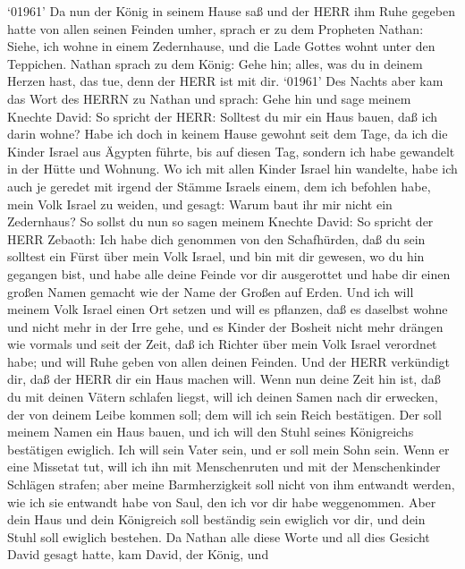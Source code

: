  `01961' Da nun der König in seinem Hause saß und der HERR
ihm Ruhe gegeben hatte von allen seinen Feinden umher, 
sprach er zu dem Propheten Nathan: Siehe, ich wohne in einem
Zedernhause, und die Lade Gottes wohnt unter den Teppichen. 
Nathan sprach zu dem König: Gehe hin; alles, was du in deinem Herzen
hast, das tue, denn der HERR ist mit dir.  `01961' Des
Nachts aber kam das Wort des HERRN zu Nathan und sprach: 
Gehe hin und sage meinem Knechte David: So spricht der HERR: Solltest du
mir ein Haus bauen, daß ich darin wohne?  Habe ich doch in
keinem Hause gewohnt seit dem Tage, da ich die Kinder Israel aus Ägypten
führte, bis auf diesen Tag, sondern ich habe gewandelt in der Hütte und
Wohnung.  Wo ich mit allen Kinder Israel hin wandelte, habe
ich auch je geredet mit irgend der Stämme Israels einem, dem ich
befohlen habe, mein Volk Israel zu weiden, und gesagt: Warum baut ihr
mir nicht ein Zedernhaus?  So sollst du nun so sagen meinem
Knechte David: So spricht der HERR Zebaoth: Ich habe dich genommen von
den Schafhürden, daß du sein solltest ein Fürst über mein Volk Israel,
 und bin mit dir gewesen, wo du hin gegangen bist, und habe
alle deine Feinde vor dir ausgerottet und habe dir einen großen Namen
gemacht wie der Name der Großen auf Erden.  Und ich will
meinem Volk Israel einen Ort setzen und will es pflanzen, daß es
daselbst wohne und nicht mehr in der Irre gehe, und es Kinder der
Bosheit nicht mehr drängen wie vormals und seit der Zeit, daß ich
Richter über mein Volk Israel verordnet habe;  und will
Ruhe geben von allen deinen Feinden. Und der HERR verkündigt dir, daß
der HERR dir ein Haus machen will.  Wenn nun deine Zeit hin
ist, daß du mit deinen Vätern schlafen liegst, will ich deinen Samen
nach dir erwecken, der von deinem Leibe kommen soll; dem will ich sein
Reich bestätigen.  Der soll meinem Namen ein Haus bauen,
und ich will den Stuhl seines Königreichs bestätigen ewiglich.
 Ich will sein Vater sein, und er soll mein Sohn sein. Wenn
er eine Missetat tut, will ich ihn mit Menschenruten und mit der
Menschenkinder Schlägen strafen;  aber meine Barmherzigkeit
soll nicht von ihm entwandt werden, wie ich sie entwandt habe von Saul,
den ich vor dir habe weggenommen.  Aber dein Haus und dein
Königreich soll beständig sein ewiglich vor dir, und dein Stuhl soll
ewiglich bestehen.  Da Nathan alle diese Worte und all dies
Gesicht David gesagt hatte,  kam David, der König, und
